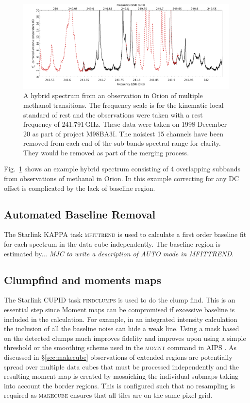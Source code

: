 \documentclass[final,authoryear,5p,times,twocolumn]{elsarticle}
\begin{document}
\begin{figure}
\begin{minipage}{\textwidth}
\includegraphics[width=\textwidth]{hybrid}
\caption{A hybrid spectrum from an observation in Orion of multiple
  methanol transitions. The frequency scale is for the kinematic local
  standard of rest and the observations were taken with a rest
  frequency of 241.791\,GHz. These data were taken on 1998 December 20
  as part of project M98BA3I. The noisiest 15 channels have been
  removed from each end of the sub-bands spectral range for
  clarity. They would be removed as part of the merging process.}
\label{fig:hybrid}
\end{minipage}
\end{figure}

Fig.\ \ref{fig:hybrid} shows an example hybrid spectrum consisting of
4 overlapping subbands from observations of methanol in Orion. In this
example correcting for any DC offset is complicated by the lack of
baseline region.

\subsection{Automated Baseline Removal}

The Starlink KAPPA task \textsc{mfittrend} is used to calculate a
first order baseline fit for each spectrum in the data cube
independently. The baseline region is estimated by...
\emph{\color{red} MJC to
  write a description of AUTO mode in MFITTREND}.


\subsection{Clumpfind and moments maps \label{sec:moment}}

The Starlink CUPID task \textsc{findclumps} is used to do the clump
find. This is an essential step since Moment maps can be compromised 
if excessive baseline is included in the calculation. For example, in an 
integrated intensity calculation the inclusion of all the baseline noise can 
hide a weak line. 
Using a mask based on the detected clumps much improves
fidelity and improves upon using a simple threshold or
the smoothing scheme used in the \textsc{momnt} command in AIPS
\cite[][ascl:9911.003]{2003ASSL..285..109G}. As discussed in \S \ref{sec:makecube}
observations of extended regions  are potentially spread over multiple data cubes 
that must be processed independently and the resulting moment map is created by
mosaicking the individual submaps taking into account the border
regions. This is configured such that no resampling is required as
\textsc{makecube} ensures that all tiles are on the same pixel grid.
\end{document}
